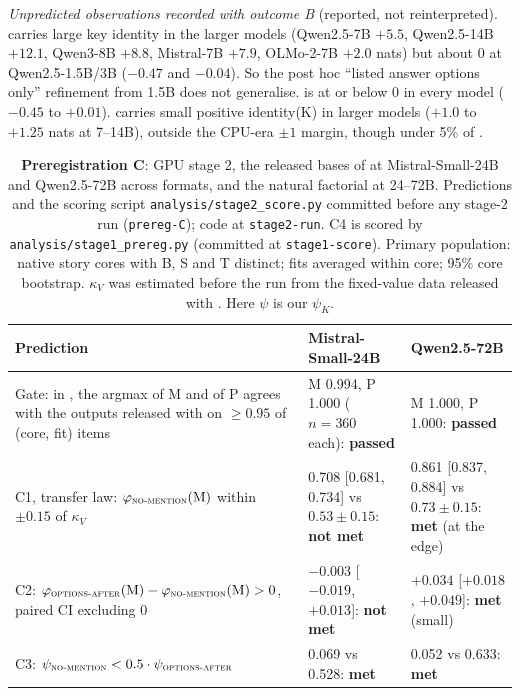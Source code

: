 \begin{table}[!ht]
\begin{minipage}{0.94\textwidth}
\emph{Unpredicted observations recorded with outcome B} (reported, not reinterpreted). \fmtPost{} carries large key identity in the larger models (Qwen2.5-7B $+5.5$, Qwen2.5-14B $+12.1$, Qwen3-8B $+8.8$, Mistral-7B $+7.9$, OLMo-2-7B $+2.0$ nats) but about 0 at Qwen2.5-1.5B/3B ($-0.47$ and $-0.04$). So the post hoc ``listed answer options only'' refinement from 1.5B does not generalise. \fmtBefore{} is at or below 0 in every model ($-0.45$ to $+0.01$). \fmtNone{} carries small positive identity(K) in larger models ($+1.0$ to $+1.25$ nats at 7--14B), outside the CPU-era $\pm 1$ margin, though under 5\% of \fmtOpt{}.
\end{minipage}
\end{table}

\begin{table}[!ht]
\centering
\footnotesize
\caption{\textbf{Preregistration C}: GPU stage 2, the released bases of \citet{anonymous2026fitted} at Mistral-Small-24B and Qwen2.5-72B across formats, and the natural factorial at 24--72B. Predictions and the scoring script \texttt{analysis/stage2\_score.py} committed before any stage-2 run (\texttt{prereg-C}); code at \texttt{stage2-run}. C4 is scored by \texttt{analysis/stage1\_prereg.py} (committed at \texttt{stage1-score}). Primary population: native story cores with B, S and T distinct; fits averaged within core; 95\% core bootstrap. $\kappa_V$ was estimated before the run from the fixed-value data released with \citet{anonymous2026fitted}. Here $\psi$ is our $\psi_K$.}
\label{tab:prereg-c}
\begin{tabular}{p{}p{}p{}}
\toprule
Prediction & Mistral-Small-24B & Qwen2.5-72B \\
\midrule
Gate: in \fmtOpt{}, the argmax of M and of P agrees with the outputs released with \citet{anonymous2026fitted} on $\geq 0.95$ of (core, fit) items & M 0.994, P 1.000 ($n = 360$ each): \textbf{passed} & M 1.000, P 1.000: \textbf{passed} \\
C1, transfer law: $\varphi_{\text{\textsc{no-mention}{}}}(\text{M})$ within $\pm 0.15$ of $\kappa_V$ & 0.708 [0.681, 0.734] vs $0.53 \pm 0.15$: \textbf{not met} & 0.861 [0.837, 0.884] vs $0.73 \pm 0.15$: \textbf{met} (at the edge) \\
C2: $\varphi_{\text{\textsc{options-after}{}}}(\text{M}) - \varphi_{\text{\textsc{no-mention}{}}}(\text{M}) > 0$, paired CI excluding 0 & $-0.003$ [$-0.019$, $+0.013$]: \textbf{not met} & $+0.034$ [$+0.018$, $+0.049$]: \textbf{met} (small) \\
C3: $\psi_{\text{\textsc{no-mention}{}}} < 0.5 \cdot \psi_{\text{\textsc{options-after}{}}}$ & 0.069 vs 0.528: \textbf{met} & 0.052 vs 0.633: \textbf{met} \\
\bottomrule
\end{tabular}


\end{table}
